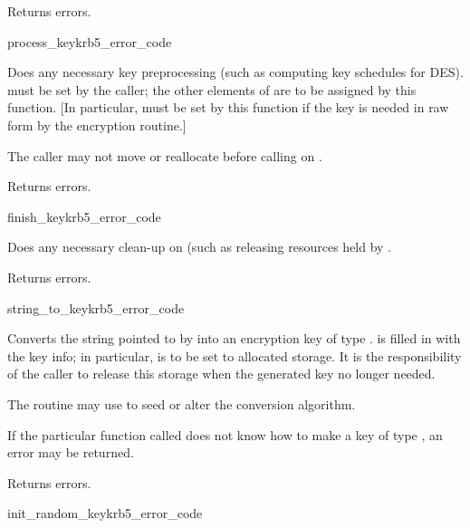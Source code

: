 Returns errors.

\begin{funcdecl}{process_key}{krb5_error_code}{\funcvoid}
\end{funcdecl}
Does any necessary key preprocessing (such as computing key
schedules for DES).
 must be set by the caller; the
other elements of  are to be assigned by this function.
[In particular,  must be set by this
function if the key is needed in raw form by the encryption routine.]

The caller may not move or reallocate  before calling
 on .

Returns errors.

\begin{funcdecl}{finish_key}{krb5_error_code}{\funcvoid}
\end{funcdecl}
Does any necessary clean-up on  (such as releasing
resources held by .

Returns errors.

\begin{funcdecl}{string_to_key}{krb5_error_code}{\funcvoid}
\end{funcdecl}
Converts the string pointed to by  into an encryption key
of type .   is filled in with
the key info; in particular,  is to
be set to allocated storage. It is the responsibility of the caller to
release this storage when the generated key no longer needed.

The routine may use  to seed or alter the conversion
algorithm.

If the particular function called does not know how to make a
key of type , an error may be returned.

Returns errors.

\begin{funcdecl}{init_random_key}{krb5_error_code}{\funcvoid}
\end{funcdecl}

